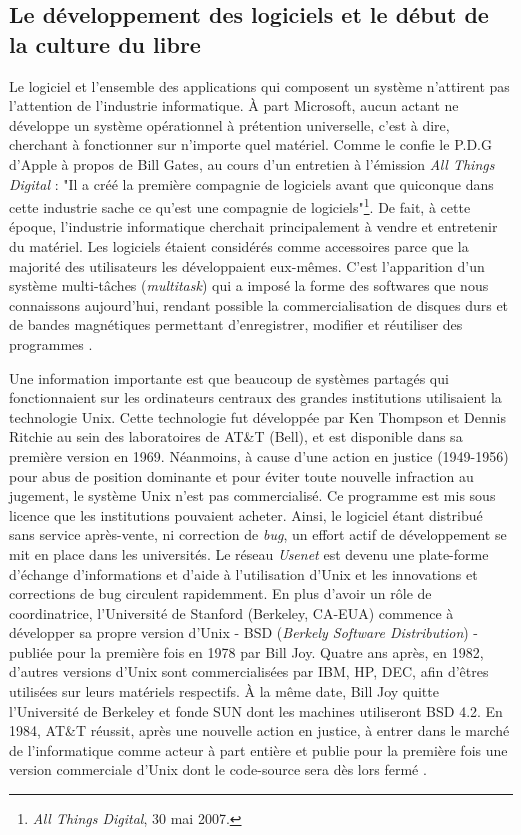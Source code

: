 \subsection{Le développement des logiciels et le début de la culture du libre}
\label{1.2.2}

Le logiciel et l'ensemble des applications qui composent un système n'attirent pas l'attention de l'industrie informatique. \`A part Microsoft, aucun actant ne développe un système opérationnel à prétention universelle, c'est à dire, cherchant à fonctionner sur n'importe quel matériel. Comme le confie le P.D.G d'Apple à propos de Bill Gates, au cours d'un entretien à l'émission \emph{All Things Digital} : "Il a créé la première compagnie de logiciels avant que quiconque dans cette industrie sache ce qu'est une compagnie de logiciels"\footnote{\emph{All Things Digital}, 30 mai 2007.}. De fait, à cette époque, l'industrie informatique cherchait principalement à vendre et entretenir du matériel. Les logiciels étaient considérés comme accessoires parce que la majorité des utilisateurs les développaient eux-mêmes. C'est l'apparition d'un système multi-tâches (\emph{multitask}) qui a imposé la forme des softwares que nous connaissons aujourd'hui, rendant possible la commercialisation de disques durs et de bandes magnétiques permettant d'enregistrer, modifier et réutiliser des programmes \citep{Muller2001}.

Une information importante est que beaucoup de systèmes partagés qui fonctionnaient sur les ordinateurs centraux des grandes institutions utilisaient la technologie Unix. Cette technologie fut développée par Ken Thompson et Dennis Ritchie au sein des laboratoires de AT\&T (Bell), et est disponible dans sa première version en 1969. Néanmoins, à cause d'une action en justice (1949-1956) pour abus de position dominante et pour éviter toute nouvelle infraction au jugement, le système Unix n'est pas commercialisé. Ce programme est mis sous licence que les institutions pouvaient acheter. Ainsi, le logiciel étant distribué sans service après-vente, ni correction de \emph{bug}, un effort actif de développement se mit en place dans les universités. Le réseau \emph{Usenet} est devenu une plate-forme d'échange d'informations et d'aide à l'utilisation d'Unix et les innovations et corrections de bug circulent rapidemment. En plus d'avoir un rôle de coordinatrice, l'Université de Stanford (Berkeley, CA-EUA) commence à développer sa propre version d'Unix - BSD (\emph{Berkely Software Distribution}) - publiée pour la première fois en 1978 par Bill Joy. Quatre ans après, en 1982, d'autres versions d'Unix sont commercialisées par IBM, HP, DEC, afin d'êtres utilisées sur leurs matériels respectifs. \`A la même date, Bill Joy quitte l'Université de Berkeley et fonde SUN dont les machines utiliseront BSD 4.2. En 1984, AT\&T réussit, après une nouvelle action en justice, à entrer dans le marché de l'informatique comme acteur à part entière et publie pour la première fois une version commerciale d'Unix dont le code-source sera dès lors fermé \citep{Muller2001}.

